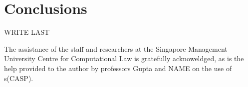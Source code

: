 \documentclass[sigconf]{acmart}
\begin{document}
\section{Conclusions}

WRITE LAST



\begin{acks}
The assistance of the staff and researchers at the Singapore Management University
Centre for Computational Law is gratefully acknoweldged, as is the help provided to
the author by professors Gupta and NAME on the use of s(CASP).
\end{acks}




\appendix
\end{document}
